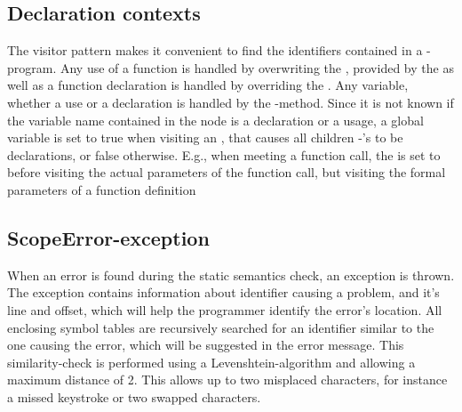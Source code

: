 \subsection{Declaration contexts}
\label{sec:deccontext}
The visitor pattern makes it convenient to find the identifiers contained in a \productname{}-program. Any use of a function is handled by overwriting the , provided by the  as well as a function declaration is handled by overriding the .
Any variable, whether a use or a declaration is handled by the -method. Since it is not known if the variable name contained in the node is a declaration or a usage, a global variable   is set to true when visiting an , that causes all children -'s to be declarations, or false otherwise. E.g., when meeting a function call, the  is set to  before visiting the actual parameters of the function call, but visiting the formal parameters of a function definition  

\subsection{ScopeError-exception}
When an error is found during the static semantics check, an exception is thrown. The exception contains information about identifier causing a problem, and it's line and offset, which will help the programmer identify the error's location. All enclosing symbol tables are recursively searched for an identifier similar to the one causing the error, which will be suggested in the error message. This similarity-check is performed using a Levenshtein-algorithm and allowing a maximum distance of 2. This allows up to two misplaced characters, for instance a missed keystroke or two swapped characters.